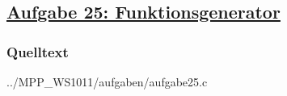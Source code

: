 \subsection
{\href{http://cst.mi.fu-berlin.de/intern/19606-P-MPP/Aufgaben/040901.html}
{Aufgabe 25: Funktionsgenerator}}

\subsubsection*{Quelltext}


{../MPP_WS1011/aufgaben/aufgabe25.c}
